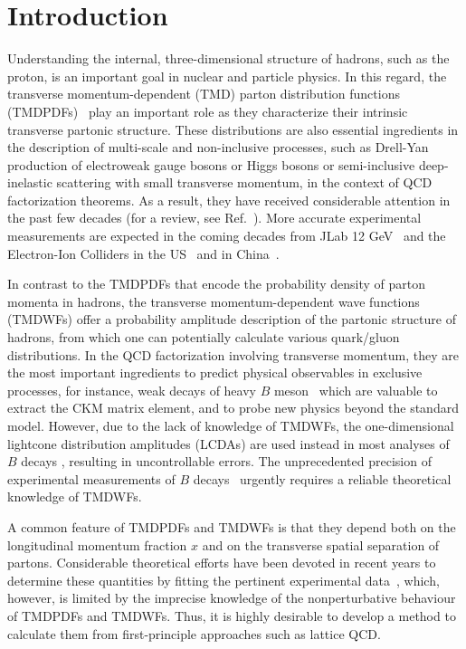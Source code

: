 \section{Introduction}

Understanding the internal, three-dimensional structure of hadrons, such as the proton, is an important goal in nuclear and particle physics. In this regard, the transverse momentum-dependent (TMD) parton distribution functions (TMDPDFs)~\cite{Collins:1981uk,Collins:1981va} play an important role as they characterize their intrinsic transverse 
partonic structure. These distributions are also essential ingredients in the description of multi-scale and non-inclusive processes, such as Drell-Yan production of electroweak gauge bosons or Higgs bosons or semi-inclusive deep-inelastic scattering with small transverse momentum, in the context of QCD factorization theorems. As a result, they have received considerable attention in the past few decades (for a review, see Ref.~\cite{Angeles-Martinez:2015sea}). More accurate experimental measurements are expected in the coming decades from JLab 12 GeV~\cite{Dudek:2012vr} and the Electron-Ion Colliders in the US~\cite{Accardi:2012qut,AbdulKhalek:2021gbh} and in China~\cite{Anderle:2021wcy}.


In contrast to the TMDPDFs that encode the probability density of parton momenta in hadrons, the transverse momentum-dependent wave functions (TMDWFs) offer a probability amplitude description of the partonic structure of hadrons, from which one can potentially calculate various quark/gluon distributions. In the QCD factorization involving transverse momentum, they are the most important ingredients to predict physical observables in exclusive processes, for instance, weak decays of heavy $B$ meson~\cite{Keum:2000wi,Lu:2000em} which are valuable to extract the CKM matrix element, and to probe new physics beyond the standard model. However, due to the lack of  knowledge of TMDWFs, the one-dimensional lightcone distribution amplitudes (LCDAs) are used instead in most analyses of $B$ decays \cite{Keum:2000wi,Lu:2000em,Nagashima:2002ia}, resulting in uncontrollable errors.  The unprecedented  precision of experimental measurements  of $B$ decays~\cite{Cerri:2018ypt} urgently requires a reliable theoretical  knowledge of TMDWFs. 

A common feature of TMDPDFs and TMDWFs is that they depend both on the longitudinal momentum fraction $x$ and on the transverse spatial separation of partons.  Considerable theoretical efforts have been devoted in recent years to determine these quantities by fitting the pertinent experimental data~\cite{Landry:1999an,Landry:2002ix,DAlesio:2014mrz,Sun:2014dqm,Konychev:2005iy,Bacchetta:2017gcc,Scimemi:2017etj,Scimemi:2019cmh,Bacchetta:2019sam}, which, however, %
is limited by the imprecise knowledge of the nonperturbative behaviour of TMDPDFs and TMDWFs. Thus, it is highly desirable to develop a method to calculate them from first-principle approaches such as lattice QCD.

